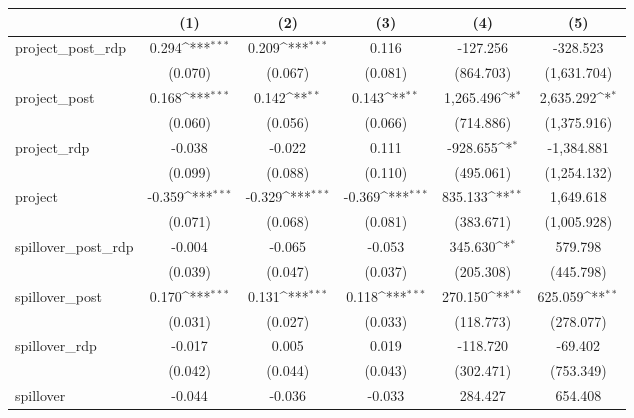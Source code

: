 {
\def\sym#1{\ifmmode^{#1}\else\(^{#1}\)\fi}
\begin{tabular}{l*{5}{c}}
\hline\hline
          &\multicolumn{1}{c}{(1)}         &\multicolumn{1}{c}{(2)}         &\multicolumn{1}{c}{(3)}         &\multicolumn{1}{c}{(4)}         &\multicolumn{1}{c}{(5)}         \\
\hline
project\_post\_rdp&    0.294\sym{***}&    0.209\sym{***}&    0.116         & -127.256         & -328.523         \\
          &  (0.070)         &  (0.067)         &  (0.081)         &(864.703)         &(1,631.704)         \\
[1em]
project\_post&    0.168\sym{***}&    0.142\sym{**} &    0.143\sym{**} &1,265.496\sym{*}  &2,635.292\sym{*}  \\
          &  (0.060)         &  (0.056)         &  (0.066)         &(714.886)         &(1,375.916)         \\
[1em]
project\_rdp&   -0.038         &   -0.022         &    0.111         & -928.655\sym{*}  &-1,384.881         \\
          &  (0.099)         &  (0.088)         &  (0.110)         &(495.061)         &(1,254.132)         \\
[1em]
project   &   -0.359\sym{***}&   -0.329\sym{***}&   -0.369\sym{***}&  835.133\sym{**} &1,649.618         \\
          &  (0.071)         &  (0.068)         &  (0.081)         &(383.671)         &(1,005.928)         \\
[1em]
spillover\_post\_rdp&   -0.004         &   -0.065         &   -0.053         &  345.630\sym{*}  &  579.798         \\
          &  (0.039)         &  (0.047)         &  (0.037)         &(205.308)         &(445.798)         \\
[1em]
spillover\_post&    0.170\sym{***}&    0.131\sym{***}&    0.118\sym{***}&  270.150\sym{**} &  625.059\sym{**} \\
          &  (0.031)         &  (0.027)         &  (0.033)         &(118.773)         &(278.077)         \\
[1em]
spillover\_rdp&   -0.017         &    0.005         &    0.019         & -118.720         &  -69.402         \\
          &  (0.042)         &  (0.044)         &  (0.043)         &(302.471)         &(753.349)         \\
[1em]
spillover &   -0.044         &   -0.036         &   -0.033         &  284.427         &  654.408         \\

\end{tabular}}
